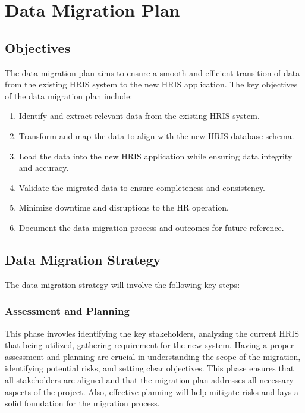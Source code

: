 \section{Data Migration Plan}

    \subsection{Objectives}

    The data migration plan aims to ensure a smooth and efficient transition of data from the existing HRIS system to the new HRIS application. The key objectives of the data migration plan include:

    \begin{enumerate}
        \item Identify and extract relevant data from the existing HRIS system.
        \item Transform and map the data to align with the new HRIS database schema.
        \item Load the data into the new HRIS application while ensuring data integrity and accuracy.
        \item Validate the migrated data to ensure completeness and consistency.
        \item Minimize downtime and disruptions to the HR operation.
        \item Document the data migration process and outcomes for future reference.
    \end{enumerate}

    \subsection{Data Migration Strategy}

    The data migration strategy will involve the following key steps:
    
        \subsubsection{Assessment and Planning}
            This phase invovles identifying the key stakeholders, analyzing the current HRIS that being utilized, gathering requirement for the new system. Having a proper assessment and planning are crucial in understanding the scope of the migration, identifying potential risks, and setting clear objectives. This phase ensures that all stakeholders are aligned and that the migration plan addresses all necessary aspects of the project. Also, effective planning will help mitigate risks and lays a solid foundation for the migration process.

